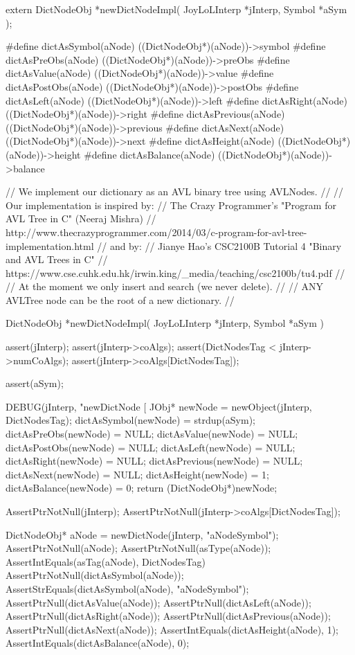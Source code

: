 \startCHeader
extern DictNodeObj *newDictNodeImpl(
  JoyLoLInterp *jInterp,
  Symbol       *aSym
);

#define dictAsSymbol(aNode)   ((DictNodeObj*)(aNode))->symbol
#define dictAsPreObs(aNode)   ((DictNodeObj*)(aNode))->preObs
#define dictAsValue(aNode)    ((DictNodeObj*)(aNode))->value
#define dictAsPostObs(aNode)  ((DictNodeObj*)(aNode))->postObs
#define dictAsLeft(aNode)     ((DictNodeObj*)(aNode))->left
#define dictAsRight(aNode)    ((DictNodeObj*)(aNode))->right
#define dictAsPrevious(aNode) ((DictNodeObj*)(aNode))->previous
#define dictAsNext(aNode)     ((DictNodeObj*)(aNode))->next
#define dictAsHeight(aNode)   ((DictNodeObj*)(aNode))->height
#define dictAsBalance(aNode)  ((DictNodeObj*)(aNode))->balance
\stopCHeader
{}

\startCCode
// We implement our dictionary as an AVL binary tree using AVLNodes.
//
// Our implementation is inspired by:
// The Crazy Programmer's "Program for AVL Tree in C" (Neeraj Mishra)
// http://www.thecrazyprogrammer.com/2014/03/c-program-for-avl-tree-implementation.html
// and by:
// Jianye Hao's CSC2100B Tutorial 4 "Binary and AVL Trees in C"
// https://www.cse.cuhk.edu.hk/irwin.king/_media/teaching/csc2100b/tu4.pdf
//
// At the moment we only insert and search (we never delete).
//
// ANY AVLTree node can be the root of a new dictionary.
//

DictNodeObj *newDictNodeImpl(
  JoyLoLInterp *jInterp,
  Symbol       *aSym
) {
  assert(jInterp);
  assert(jInterp->coAlgs);
  assert(DictNodesTag < jInterp->numCoAlgs);
  assert(jInterp->coAlgs[DictNodesTag]);
  
  assert(aSym);
  
  DEBUG(jInterp, "newDictNode [%
  JObj* newNode   = newObject(jInterp, DictNodesTag);
  dictAsSymbol(newNode)   = strdup(aSym);
  dictAsPreObs(newNode)   = NULL;
  dictAsValue(newNode)    = NULL;
  dictAsPostObs(newNode)  = NULL;
  dictAsLeft(newNode)     = NULL;
  dictAsRight(newNode)    = NULL;
  dictAsPrevious(newNode) = NULL;
  dictAsNext(newNode)     = NULL;
  dictAsHeight(newNode)   = 1;
  dictAsBalance(newNode)  = 0;
  return (DictNodeObj*)newNode;
}
\stopCCode


\startCTest
  AssertPtrNotNull(jInterp);
  AssertPtrNotNull(jInterp->coAlgs[DictNodesTag]);

  DictNodeObj* aNode = newDictNode(jInterp, "aNodeSymbol");
  AssertPtrNotNull(aNode);
  AssertPtrNotNull(asType(aNode));
  AssertIntEquals(asTag(aNode), DictNodesTag)
  AssertPtrNotNull(dictAsSymbol(aNode));
  AssertStrEquals(dictAsSymbol(aNode), "aNodeSymbol");
  AssertPtrNull(dictAsValue(aNode));
  AssertPtrNull(dictAsLeft(aNode));
  AssertPtrNull(dictAsRight(aNode));
  AssertPtrNull(dictAsPrevious(aNode));
  AssertPtrNull(dictAsNext(aNode));
  AssertIntEquals(dictAsHeight(aNode), 1);
  AssertIntEquals(dictAsBalance(aNode), 0);
\stopCTest
\stopTestCase
\stopTestSuite

